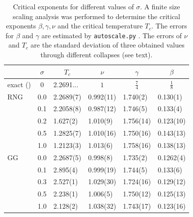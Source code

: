     \begin{table}[htbp]
        \center
        \begin{tabular}{l l l l l l}
            \toprule
             & \multicolumn{1}{c}{\(\sigma\)} & \multicolumn{1}{c}{\(T_c\)} & \multicolumn{1}{c}{\(\nu\)} & \multicolumn{1}{c}{\(\gamma\)} & \multicolumn{1}{c}{\(\beta\)}\\
            \midrule
            exact (\cite[p. 59]{Pelissetto2002}) & \multicolumn{1}{c}{\(0\)} & 2.2691... & \multicolumn{1}{c}{\(1\)} & \multicolumn{1}{c}{\(\frac{7}{4}\)} & \multicolumn{1}{c}{\(\frac{1}{8}\)}\\
            \midrule
            RNG          & 0.0 & 2.2689(7)& 0.992(11)& 1.740(2) & 0.130(1) \\
                         & 0.1 & 2.2058(8)& 0.987(12)& 1.746(5) & 0.133(4) \\
                         & 0.2 & 1.627(2) & 1.010(9) & 1.756(14)& 0.123(10)\\
                         & 0.5 & 1.2825(7)& 1.010(16)& 1.750(16)& 0.143(13)\\
                         & 1.0 & 1.2123(3)& 1.013(6) & 1.758(16)& 0.138(13)\\
            \midrule
            GG           & 0.0 & 2.2687(5)& 0.998(8) & 1.735(2) & 0.1262(4)\\
                         & 0.1 & 2.895(4) & 0.999(19)& 1.744(5) & 0.133(6) \\
                         & 0.3 & 2.527(1) & 1.029(30)& 1.724(16)& 0.129(12)\\
                         & 0.5 & 2.238(1) & 1.006(5) & 1.750(12)& 0.125(13)\\
                         & 1.0 & 2.128(2) & 1.038(32)& 1.743(17)& 0.123(16)\\

            \bottomrule
        \end{tabular}
        \caption[Critical Exponents for Different $\sigma$]{
            Critical exponents for different values of \(\sigma\). A finite size
            scaling analysis was performed to determine the critical
            exponents \(\beta, \gamma, \nu\) and the critical temperature
            \(T_c\). The errors for \(\beta\) and \(\gamma\) are estimated
            by \texttt{autoscale.py} \cite{autoscale2009}. The errors of
            \(\nu\) and \(T_c\) are the standard deviation of three obtained
            values through different collapses (see text).
        }
        \label{tab:critExp}
    \end{table}\\

